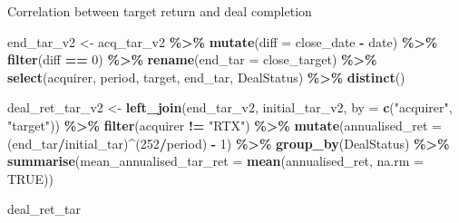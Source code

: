 \documentclass[
]{article}
\newenvironment{Shaded}{\begin{snugshade}}{\end{snugshade}}
\newcommand{\DataTypeTok}[1]{\textcolor[rgb]{0.13,0.29,0.53}{#1}}
\newcommand{\DecValTok}[1]{\textcolor[rgb]{0.00,0.00,0.81}{#1}}
\newcommand{\KeywordTok}[1]{\textcolor[rgb]{0.13,0.29,0.53}{\textbf{#1}}}
\newcommand{\NormalTok}[1]{#1}
\newcommand{\OperatorTok}[1]{\textcolor[rgb]{0.81,0.36,0.00}{\textbf{#1}}}
\newcommand{\OtherTok}[1]{\textcolor[rgb]{0.56,0.35,0.01}{#1}}
\newcommand{\StringTok}[1]{\textcolor[rgb]{0.31,0.60,0.02}{#1}}
\begin{document}
Correlation between target return and deal completion

\begin{Shaded}
\begin{Highlighting}[]
\NormalTok{end\_tar\_v2 \textless{}{-}}\StringTok{ }\NormalTok{acq\_tar\_v2 }\OperatorTok{\%\textgreater{}\%}
\StringTok{  }\KeywordTok{mutate}\NormalTok{(}\DataTypeTok{diff =}\NormalTok{ close\_date }\OperatorTok{{-}}\StringTok{ }\NormalTok{date) }\OperatorTok{\%\textgreater{}\%}
\StringTok{  }\KeywordTok{filter}\NormalTok{(diff }\OperatorTok{==}\StringTok{ }\DecValTok{0}\NormalTok{) }\OperatorTok{\%\textgreater{}\%}
\StringTok{  }\KeywordTok{rename}\NormalTok{(}\DataTypeTok{end\_tar =}\NormalTok{ close\_target) }\OperatorTok{\%\textgreater{}\%}
\StringTok{  }\KeywordTok{select}\NormalTok{(acquirer, period, target, end\_tar, DealStatus) }\OperatorTok{\%\textgreater{}\%}
\StringTok{  }\KeywordTok{distinct}\NormalTok{()}


\NormalTok{deal\_ret\_tar\_v2 \textless{}{-}}\StringTok{ }\KeywordTok{left\_join}\NormalTok{(end\_tar\_v2, initial\_tar\_v2, }\DataTypeTok{by =} \KeywordTok{c}\NormalTok{(}\StringTok{"acquirer"}\NormalTok{, }\StringTok{"target"}\NormalTok{)) }\OperatorTok{\%\textgreater{}\%}
\StringTok{  }\KeywordTok{filter}\NormalTok{(acquirer }\OperatorTok{!=}\StringTok{ "RTX"}\NormalTok{) }\OperatorTok{\%\textgreater{}\%}
\StringTok{  }\KeywordTok{mutate}\NormalTok{(}\DataTypeTok{annualised\_ret =}\NormalTok{ (end\_tar}\OperatorTok{/}\NormalTok{initial\_tar)}\OperatorTok{\^{}}\NormalTok{(}\DecValTok{252}\OperatorTok{/}\NormalTok{period) }\OperatorTok{{-}}\StringTok{ }\DecValTok{1}\NormalTok{) }\OperatorTok{\%\textgreater{}\%}
\StringTok{  }\KeywordTok{group\_by}\NormalTok{(DealStatus) }\OperatorTok{\%\textgreater{}\%}
\StringTok{  }\KeywordTok{summarise}\NormalTok{(}\DataTypeTok{mean\_annualised\_tar\_ret =} \KeywordTok{mean}\NormalTok{(annualised\_ret, }\DataTypeTok{na.rm =} \OtherTok{TRUE}\NormalTok{))}

\NormalTok{deal\_ret\_tar}
\end{Highlighting}
\end{Shaded}

 
  \providecommand{\huxb}[2]{\arrayrulecolor[RGB]{#1}\global\arrayrulewidth=#2pt}
  \providecommand{\huxvb}[2]{\color[RGB]{#1}\vrule width #2pt}
  \providecommand{\huxtpad}[1]{\rule{0pt}{#1}}
  \providecommand{\huxbpad}[1]{\rule[-#1]{0pt}{#1}}
\end{document}
